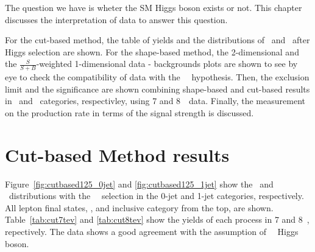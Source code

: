 The question we have is wheter the SM Higgs boson exists or not.  
This chapter discusses the interpretation of data to answer this question.

For the cut-based method, the table of yields and the distributions 
of \mT\ and \mll\ after Higgs selection are shown. 
For the shape-based method, the 2-dimensional and the $\frac{S}{S+B}$-weighted 1-dimensional
data - backgrounds plots are shown to see by eye to check the 
compatibility of data with the ~\GeV\ hypothesis. 
Then, the exclusion limit and the significance are shown combining 
shape-based and cut-based results in \DF\ and \SF\ categories, respectivley, 
using 7 and 8~\TeV\ data. Finally, the measurement on the 
production rate in terms of the signal strength is discussed. 


\section{Cut-based Method results}  

Figure~\ref{fig:cutbased125_0jet} and \ref{fig:cutbased125_1jet} show the
\mT\ and \mll\ distributions with the ~\GeV\ selection 
in the 0-jet and 1-jet categories, respectively. 
All lepton final states, \DF, \SF and inclusive category from the top, are shown. 
Table~\ref{tab:cut7tev} and \ref{tab:cut8tev} show the yields of each process 
in 7 and 8~\TeV, repectively.
The data shows a good agreement with the assumption of ~\GeV\ Higgs boson. 


